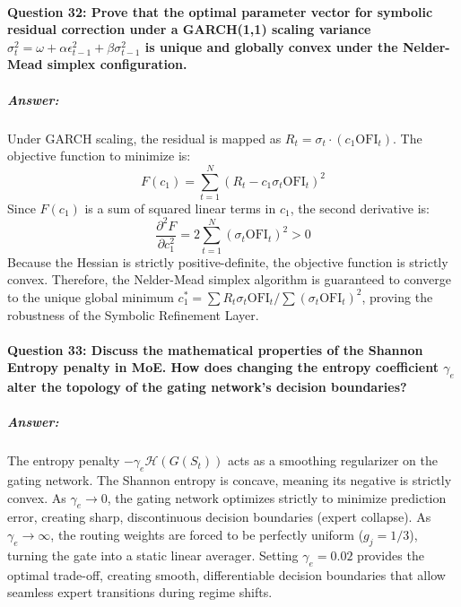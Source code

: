 \documentclass[11pt,a4paper]{article}
\begin{document}
\paragraph{Question 32: Prove that the optimal parameter vector for symbolic residual correction under a GARCH(1,1) scaling variance $\sigma_t^2 = \omega + \alpha \epsilon_{t-1}^2 + \beta \sigma_{t-1}^2$ is unique and globally convex under the Nelder-Mead simplex configuration.}
\subparagraph{Answer:}
Under GARCH scaling, the residual is mapped as $R_t = \sigma_t \cdot (c_1 \text{OFI}_t)$. The objective function to minimize is:
\begin{equation}
    F(c_1) = \sum_{t=1}^N \left( R_t - c_1 \sigma_t \text{OFI}_t \right)^2
\end{equation}
Since $F(c_1)$ is a sum of squared linear terms in $c_1$, the second derivative is:
\begin{equation}
    \frac{\partial^2 F}{\partial c_1^2} = 2 \sum_{t=1}^N (\sigma_t \text{OFI}_t)^2 > 0
\end{equation}
Because the Hessian is strictly positive-definite, the objective function is strictly convex. Therefore, the Nelder-Mead simplex algorithm is guaranteed to converge to the unique global minimum $c_1^* = \sum R_t \sigma_t \text{OFI}_t / \sum (\sigma_t \text{OFI}_t)^2$, proving the robustness of the Symbolic Refinement Layer.

\paragraph{Question 33: Discuss the mathematical properties of the Shannon Entropy penalty in MoE. How does changing the entropy coefficient $\gamma_e$ alter the topology of the gating network's decision boundaries?}
\subparagraph{Answer:}
The entropy penalty $-\gamma_e \mathcal{H}(G(S_t))$ acts as a smoothing regularizer on the gating network. The Shannon entropy is concave, meaning its negative is strictly convex. As $\gamma_e \to 0$, the gating network optimizes strictly to minimize prediction error, creating sharp, discontinuous decision boundaries (expert collapse). As $\gamma_e \to \infty$, the routing weights are forced to be perfectly uniform ($g_j = 1/3$), turning the gate into a static linear averager. Setting $\gamma_e = 0.02$ provides the optimal trade-off, creating smooth, differentiable decision boundaries that allow seamless expert transitions during regime shifts.
\end{document}
